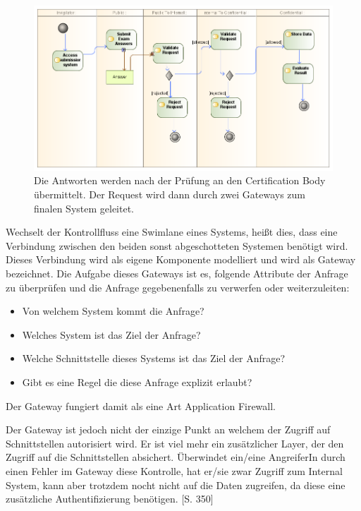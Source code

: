 \begin{figure}[H]
    \centering
    \includegraphics[scale=0.5]{uml/takeexamactivity1.png}
    \caption{Die Antworten werden nach der Prüfung an den Certification Body übermittelt. Der Request wird dann durch zwei Gateways zum finalen System geleitet.}
\end{figure}

Wechselt der Kontrollfluss eine Swimlane eines Systems, heißt dies, dass eine Verbindung zwischen den beiden sonst abgeschotteten Systemen benötigt wird. Dieses Verbindung wird als eigene Komponente modelliert und wird als Gateway bezeichnet. Die Aufgabe dieses Gateways ist es, folgende Attribute der Anfrage zu überprüfen und die Anfrage gegebenenfalls zu verwerfen oder weiterzuleiten:

\begin{itemize}
  \item Von welchem System kommt die Anfrage?
  \item Welches System ist das Ziel der Anfrage?
  \item Welche Schnittstelle dieses Systems ist das Ziel der Anfrage?
  \item Gibt es eine Regel die diese Anfrage explizit erlaubt?
\end{itemize}

Der Gateway fungiert damit als eine Art Application Firewall.

Der Gateway ist jedoch nicht der einzige Punkt an welchem der Zugriff auf Schnittstellen autorisiert wird. Er ist viel mehr ein zusätzlicher Layer, der den Zugriff auf die Schnittstellen absichert. Überwindet ein/eine AngreiferIn durch einen Fehler im Gateway diese Kontrolle, hat er/sie zwar Zugriff zum Internal System, kann aber trotzdem nocht nicht auf die Daten zugreifen, da diese eine zusätzliche Authentifizierung benötigen. \cite{sec}[S. 350]

